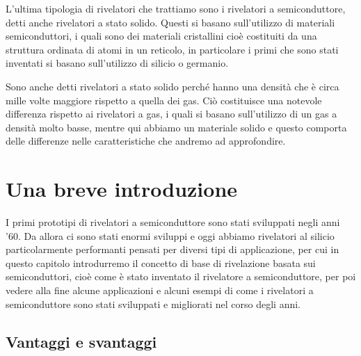 L'ultima tipologia di rivelatori che trattiamo sono i rivelatori a semiconduttore, detti anche rivelatori a stato solido. Questi si basano sull'utilizzo di materiali semiconduttori, i quali sono dei materiali cristallini cioè costituiti da una struttura ordinata di atomi in un reticolo, in particolare i primi che sono stati inventati si basano sull'utilizzo di silicio o germanio.

Sono anche detti rivelatori a stato solido perché hanno una densità che è circa mille volte maggiore rispetto a quella dei gas. Ciò costituisce una notevole differenza rispetto ai rivelatori a gas, i quali si basano sull'utilizzo di un gas a densità molto basse, mentre qui abbiamo un materiale solido e questo comporta delle differenze nelle caratteristiche che andremo ad approfondire.

\section{Una breve introduzione}
I primi prototipi di rivelatori a semiconduttore sono stati sviluppati negli anni '60. Da allora ci sono stati enormi sviluppi e oggi abbiamo rivelatori al silicio particolarmente performanti pensati per diversi tipi di applicazione, per cui in questo capitolo introdurremo il concetto di base di rivelazione basata sui semiconduttori, cioè come è stato inventato il rivelatore a semiconduttore, per poi vedere alla fine alcune applicazioni e alcuni esempi di come i rivelatori a semiconduttore sono stati sviluppati e migliorati nel corso degli anni.

\subsection{Vantaggi e svantaggi}

